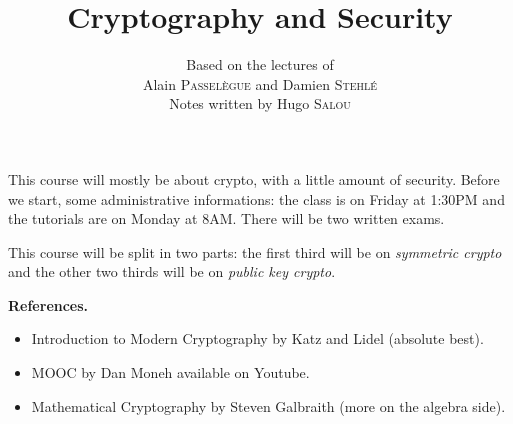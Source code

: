 \documentclass{../notes-en}
\title{Cryptography and Security}
\author{Based on the lectures of\\ Alain \textsc{Passelègue} and Damien \textsc{Stehlé} \\ Notes written by Hugo \textsc{Salou}}
\begin{document}
  \maketitle

  \dominitoc
  \tableofcontents

  \pagebreak

  This course will mostly be about crypto, with a little amount of security.
  Before we start, some administrative informations: the class is on Friday at 1:30PM and the tutorials are on Monday at 8AM.
  There will be two written exams.

  This course will be split in two parts: the first third will be on \textit{symmetric crypto} and the other two thirds will be on \textit{public key crypto}.

  \textbf{References.}
  \begin{itemize}
    \item Introduction to Modern Cryptography by Katz and Lidel (absolute best).
    \item MOOC by Dan Moneh available on Youtube.
    \item Mathematical Cryptography by Steven Galbraith (more on the algebra side).
  \end{itemize}

  
  
  
\end{document}
